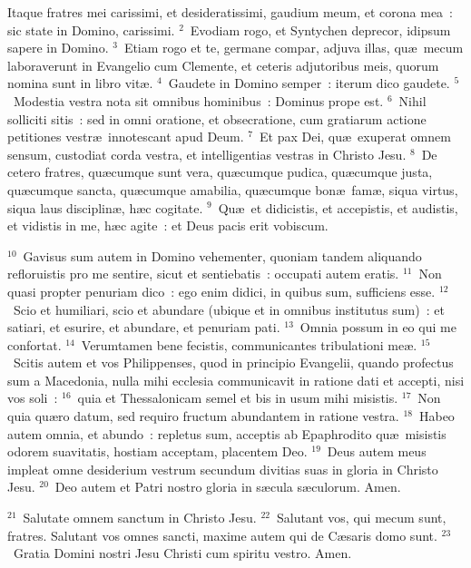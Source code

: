 \lettrine[lines=3,image=true,loversize=0.05,lraise=-0.03]{I}{}taque fratres mei carissimi, et desideratissimi, gaudium meum, et corona mea~: sic state in Domino, carissimi.
${}^{2}$~Evodiam rogo, et Syntychen deprecor, idipsum sapere in Domino.
${}^{3}$~Etiam rogo et te, germane compar, adjuva illas, qu\ae\ mecum laboraverunt in Evangelio cum Clemente, et ceteris adjutoribus meis, quorum nomina sunt in libro vit\ae .
${}^{4}$~Gaudete in Domino semper~: iterum dico gaudete.
${}^{5}$~Modestia vestra nota sit omnibus hominibus~: Dominus prope est.
${}^{6}$~Nihil solliciti sitis~: sed in omni oratione, et obsecratione, cum gratiarum actione petitiones vestr\ae\ innotescant apud Deum.
${}^{7}$~Et pax Dei, qu\ae\ exuperat omnem sensum, custodiat corda vestra, et intelligentias vestras in Christo Jesu.
${}^{8}$~De cetero fratres, qu\ae cumque sunt vera, qu\ae cumque pudica, qu\ae cumque justa, qu\ae cumque sancta, qu\ae cumque amabilia, qu\ae cumque bon\ae\ fam\ae , siqua virtus, siqua laus disciplin\ae , h\ae c cogitate.
${}^{9}$~Qu\ae\ et didicistis, et accepistis, et audistis, et vidistis in me, h\ae c agite~: et Deus pacis erit vobiscum.


${}^{10}$~Gavisus sum autem in Domino vehementer, quoniam tandem aliquando refloruistis pro me sentire, sicut et sentiebatis~: occupati autem eratis.
${}^{11}$~Non quasi propter penuriam dico~: ego enim didici, in quibus sum, sufficiens esse.
${}^{12}$~Scio et humiliari, scio et abundare (ubique et in omnibus institutus sum)~: et satiari, et esurire, et abundare, et penuriam pati.
${}^{13}$~Omnia possum in eo qui me confortat.
${}^{14}$~Verumtamen bene fecistis, communicantes tribulationi me\ae .
${}^{15}$~Scitis autem et vos Philippenses, quod in principio Evangelii, quando profectus sum a Macedonia, nulla mihi ecclesia communicavit in ratione dati et accepti, nisi vos soli~:
${}^{16}$~quia et Thessalonicam semel et bis in usum mihi misistis.
${}^{17}$~Non quia qu\ae ro datum, sed requiro fructum abundantem in ratione vestra.
${}^{18}$~Habeo autem omnia, et abundo~: repletus sum, acceptis ab Epaphrodito qu\ae\ misistis odorem suavitatis, hostiam acceptam, placentem Deo.
${}^{19}$~Deus autem meus impleat omne desiderium vestrum secundum divitias suas in gloria in Christo Jesu.
${}^{20}$~Deo autem et Patri nostro gloria in s\ae cula s\ae culorum. Amen.


${}^{21}$~Salutate omnem sanctum in Christo Jesu.
${}^{22}$~Salutant vos, qui mecum sunt, fratres. Salutant vos omnes sancti, maxime autem qui de C\ae saris domo sunt.
${}^{23}$~Gratia Domini nostri Jesu Christi cum spiritu vestro. Amen.
